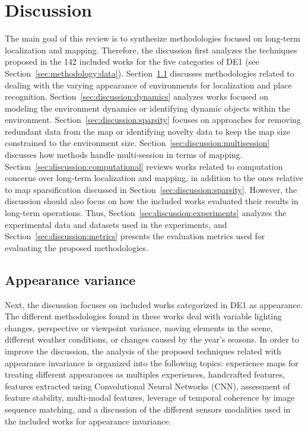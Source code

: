 \section{Discussion}
\label{sec:discussion}

The main goal of this review is to synthesize methodologies focused on long-term localization and mapping. Therefore, the discussion first analyzes the techniques proposed in the 142 included works for the five categories of DE1 (see Section~\ref{sec:methodology:data}). Section~\ref{sec:discussion:appearance} discusses methodologies related to dealing with the varying appearance of environments for localization and place recognition. Section~\ref{sec:discussion:dynamics} analyzes works focused on modeling the environment dynamics or identifying dynamic objects within the environment. Section~\ref{sec:discussion:sparsity} focuses on approaches for removing redundant data from the map or identifying novelty data to keep the map size constrained to the environment size. Section~\ref{sec:discussion:multisession} discusses how methods handle multi-session in terms of mapping. Section~\ref{sec:discussion:computational} reviews works related to computation concerns over long-term localization and mapping, in addition to the ones relative to map sparsification discussed in Section~\ref{sec:discussion:sparsity}. However, the discussion should also focus on how the included works evaluated their results in long-term operations. Thus, Section~\ref{sec:discussion:experiments} analyzes the experimental data and datasets used in the experiments, and Section~\ref{sec:discussion:metrics} presents the evaluation metrics used for evaluating the proposed methodologies.





\subsection{Appearance variance}
\label{sec:discussion:appearance}

Next, the discussion focuses on included works categorized in DE1 as appearance. The different methodologies found in these works deal with variable lighting changes, perspective or viewpoint variance, moving elements in the scene, different weather conditions, or changes caused by the year's seasons.
In order to improve the discussion, the analysis of the proposed techniques related with appearance invariance is organized into the following topics: experience maps for treating different appearances as multiples experiences, handcrafted features, features extracted using Convolutional Neural Networks (CNN), assessment of feature stability, multi-modal features, leverage of temporal coherence by image sequence matching, and a discussion of the different sensors modalities used in the included works for appearance invariance.



